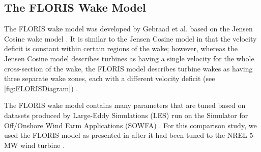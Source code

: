 \documentclass[a4paper]{jpconf}
\begin{document}
\subsection{The FLORIS Wake Model}
The FLORIS wake model was developed by Gebraad et al. based on the Jensen Cosine wake model \cite{gebraad2014}. It is similar to the Jensen Cosine model in that the velocity deficit is constant within certain regions of the wake; however, whereas the Jensen Cosine model describes turbines as having a single velocity for the whole cross-section of the wake, the FLORIS model describes turbine wakes as having three separate wake zones, each with a different velocity deficit (see \cref{fig:FLORISDiagram}) \cite{gebraad2014}. 

The FLORIS wake model contains many parameters that are tuned based on datasets produced by Large-Eddy Simulations (LES) run on the Simulator for Off/Onshore Wind Farm Applications (SOWFA) \cite{fleming2015}. For this comparison study, we used the FLORIS model as presented in \cite{thomas2016-improving-floris} after it had been tuned to the NREL 5-MW wind turbine \cite{jonkman2009}.
\end{document}
